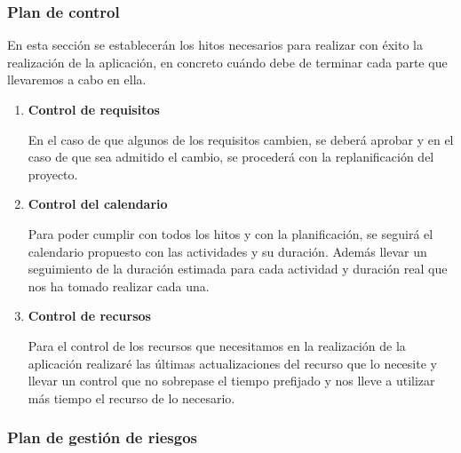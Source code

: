 \documentclass[a4paper,11pt, twoside]{article}
\begin{document}
\subsubsection{Plan de control}
En esta sección se establecerán los hitos necesarios para realizar con éxito la realización de la aplicación, en concreto cuándo debe de terminar cada parte que llevaremos a cabo en ella.
\begin{enumerate}
\item \textbf{Control de requisitos}

\quad En el caso de que algunos de los requisitos cambien, se deberá aprobar y en el caso de que sea admitido el cambio, se procederá con la replanificación del proyecto.

\item \textbf{Control del calendario}

\quad Para poder cumplir con todos los hitos y con la planificación, se seguirá el calendario propuesto con las actividades y su duración. Además llevar un seguimiento de la duración estimada para cada actividad y duración real que nos ha tomado realizar cada una.

\item \textbf{Control de recursos}

\quad Para el control de los recursos que necesitamos en la realización de la aplicación realizaré las últimas actualizaciones del recurso que lo necesite y llevar un control que no sobrepase el tiempo prefijado y nos lleve a utilizar más tiempo el recurso de lo necesario.

\end{enumerate}

\newpage

\subsubsection{Plan de gestión de riesgos}
\end{document}
